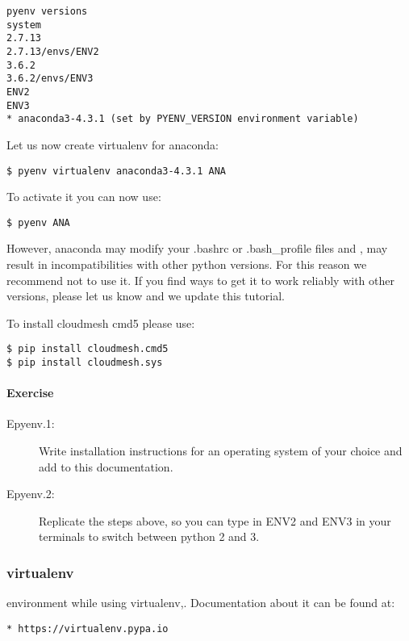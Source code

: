 \begin{verbatim}
pyenv versions
system
2.7.13
2.7.13/envs/ENV2
3.6.2
3.6.2/envs/ENV3
ENV2 
ENV3
* anaconda3-4.3.1 (set by PYENV_VERSION environment variable)
\end{verbatim}

Let us now create virtualenv for anaconda:

\begin{verbatim}
$ pyenv virtualenv anaconda3-4.3.1 ANA
\end{verbatim}

To activate it you can now use:

\begin{verbatim}
$ pyenv ANA
\end{verbatim}

However, anaconda may modify your .bashrc or .bash\_profile files and ,
may result in incompatibilities with other python versions. For this
reason we recommend not to use it. If you find ways to get it to work
reliably with other versions, please let us know and we update this
tutorial.

To install cloudmesh cmd5 please use:

\begin{verbatim}
$ pip install cloudmesh.cmd5
$ pip install cloudmesh.sys
\end{verbatim}

\paragraph{Exercise}\label{exercise}

\begin{description}
\item[Epyenv.1:]
Write installation instructions for an operating system of your choice
and add to this documentation.
\item[Epyenv.2:]
Replicate the steps above, so you can type in ENV2 and ENV3 in your
terminals to switch between python 2 and 3.
\end{description}

\subsubsection{virtualenv}\label{virtualenv}

environment while using virtualenv,. Documentation about it can be found
at:

\begin{verbatim}
* https://virtualenv.pypa.io
\end{verbatim}

